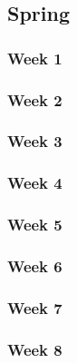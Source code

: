 \documentclass[../final.tex]{subfiles}
\begin{document}
\subsection{Spring}
\subsubsection{Week 1}
\subsubsection{Week 2}
\subsubsection{Week 3}
\subsubsection{Week 4}
\subsubsection{Week 5}
\subsubsection{Week 6}
\subsubsection{Week 7}
\subsubsection{Week 8}
\end{document}
